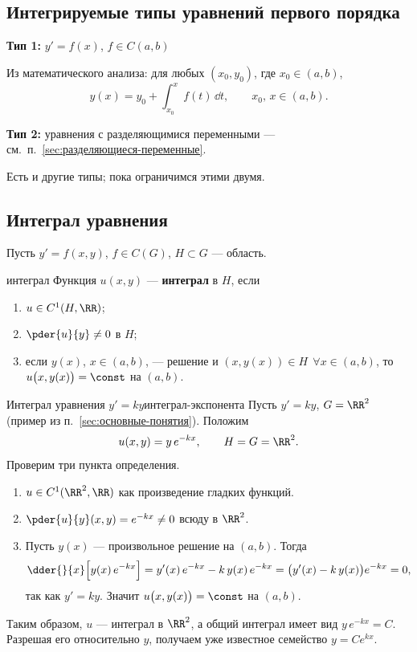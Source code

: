 \subsection{Интегрируемые типы уравнений первого порядка}

\textbf{Тип 1:} $y' = f(x)$, $f \in C(a,b)$

Из математического анализа: для любых $(x_0,y_0)$, где $x_0 \in (a,b)$,
\[
y(x) = y_0 + \int_{x_0}^{x} f(t)\,\dd t, \qquad x_0,\, x \in (a,b).
\]

\textbf{Тип 2:} уравнения с разделяющимися переменными ---
см.\ п.~\ref{sec:разделяющиеся-переменные}.

Есть и другие типы; пока ограничимся этими двумя.

\subsection{Интеграл уравнения}\label{sec:интеграл-уравнения}

Пусть $y' = f(x,y)$, $f \in C(G)$, $H \subset G$ --- область.

\begin{Definition}{}{интеграл}
	Функция $u(x,y)$ --- \textbf{интеграл} в $H$, если
	\begin{enumerate}
		\item $u \in C^1(H,\RR)$;
		\item $\pder{u}{y} \neq 0$ в $H$;
		\item если $y(x)$, $x \in (a,b)$, --- решение и
		$(x,y(x)) \in H\ \ \forall x \in (a,b)$, то
		$u\bigl(x, y(x)\bigr) = \const$ на $(a,b)$.
	\end{enumerate}
\end{Definition}

\begin{Example}[addon]{Интеграл уравнения $y' = ky$}{интеграл-экспонента}
	Пусть $y' = ky$, $G = \RR^2$ (пример из п.~\ref{sec:основные-понятия}).
	Положим
	\[
	u(x,y) = y\,e^{-kx}, \qquad H = G = \RR^2.
	\]
	Проверим три пункта определения.
	\begin{enumerate}
		\item $u \in C^1(\RR^2,\RR)$ как произведение гладких функций.
		\item $\pder{u}{y}(x,y) = e^{-kx} \neq 0$ всюду в $\RR^2$.
		\item Пусть $y(x)$ --- произвольное решение на $(a,b)$. Тогда
		\[
		\dder{}{x}\Bigl[y(x)\,e^{-kx}\Bigr]
		= y'(x)\,e^{-kx} - k\,y(x)\,e^{-kx}
		= \bigl(y'(x) - k\,y(x)\bigr)e^{-kx} = 0,
		\]
		так как $y' = ky$. Значит $u\bigl(x,y(x)\bigr) = \const$ на $(a,b)$.
	\end{enumerate}
	Таким образом, $u$ --- интеграл в $\RR^2$, а общий интеграл имеет вид
	$y\,e^{-kx} = C$. Разрешая его относительно $y$, получаем уже известное
	семейство $y = C e^{kx}$.
\end{Example}

